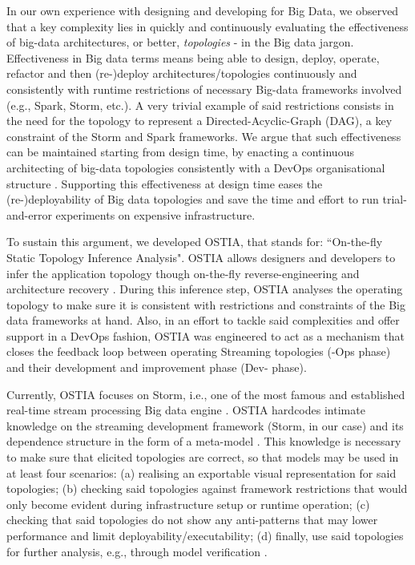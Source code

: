 In our own experience with designing and developing for Big Data, we observed that a key complexity lies in quickly and continuously evaluating the effectiveness of big-data architectures, or better, \emph{topologies} - in the Big data jargon. Effectiveness in Big data terms means being able to design, deploy, operate, refactor and then (re-)deploy architectures/topologies continuously and consistently with runtime restrictions of necessary Big-data frameworks involved (e.g., Spark, Storm, etc.). A very trivial example of said restrictions consists in the need for the topology to represent a Directed-Acyclic-Graph (DAG), a key constraint of the Storm and Spark frameworks.
We argue that such effectiveness can be maintained starting from design time, by enacting a continuous architecting of big-data topologies consistently with a DevOps organisational structure \cite{ossslr,devops}. Supporting this effectiveness at design time eases the (re-)deployability of Big data topologies and save the time and effort to run trial-and-error experiments on expensive infrastructure.

To sustain this argument, we developed OSTIA, that stands for: ``On-the-fly Static Topology Inference Analysis". OSTIA allows designers and developers to infer the application topology though on-the-fly reverse-engineering and architecture recovery \cite{archrec}. During this inference step, OSTIA analyses the operating topology to make sure it is consistent with restrictions and constraints of the Big data frameworks at hand. Also, in an effort to tackle said complexities and offer support in a DevOps fashion, OSTIA was engineered to act as a mechanism that closes the feedback loop between operating Streaming topologies (-Ops phase) and their development and improvement phase (Dev- phase).

Currently, OSTIA focuses on Storm, i.e., one of the most famous and established real-time stream processing Big data engine \cite{storm}. OSTIA hardcodes intimate knowledge on the streaming development framework (Storm, in our case) and its dependence structure in the form of a meta-model \cite{mda}. This knowledge is necessary to make sure that elicited topologies are correct, so that models may be used in at least four scenarios: (a) realising an exportable visual representation for said topologies; (b) checking said topologies against framework restrictions that would only become evident during infrastructure setup or runtime operation; (c) checking that said topologies do not show any anti-patterns \cite{patternoriented2000} that may lower performance and limit deployability/executability; (d) finally, use said topologies for further analysis, e.g., through model verification \cite{icsoft}.

